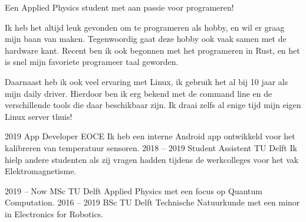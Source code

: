 \documentclass[9pt]{developercv} %
\begin{document}
\vspace{0.5cm}



\begin{minipage}[t]{1\textwidth} %
	\vspace{-\baselineskip} %

	Een Applied Physics student met aan passie voor programeren!

	Ik heb het altijd leuk gevonden om te programeren als hobby, en wil er graag mijn baan van maken.
	Tegenwoordig gaat deze hobby ook vaak samen met de hardware kant.
	Recent ben ik ook begonnen met het programeren in Rust, en het is snel mijn favoriete programeer taal geworden.

	Daarnaast heb ik ook veel ervaring met Linux, ik gebruik het al bij 10 jaar als mijn daily driver.
	Hierdoor ben ik erg bekend met de command line en de verschillende tools die daar beschikbaar zijn.
	Ik draai zelfs al enige tijd mijn eigen Linux server thuis!

\end{minipage}



\begin{entrylist}
	\entry
		{2019}
		{App Developer}
		{EOCE}
		{Ik heb een interne Android app ontwikkeld voor het kalibreren van temperatuur sensoren.}
	\entry
		{2018 -- 2019}
		{Student Assistent}
		{TU Delft}
		{Ik hielp andere studenten als zij vragen hadden tijdens de werkcolleges voor het vak Elektromagnetisme.}
\end{entrylist}



\begin{entrylist}
	\entry
		{2019 -- Now}
		{MSc}
		{TU Delft}
		{Applied Physics met een focus op Quantum Computation.}
	\entry
		{2016 -- 2019}
		{BSc}
		{TU Delft}
		{Technische Natuurkunde met een minor in Electronics for Robotics.}
\end{entrylist}
\end{document}
